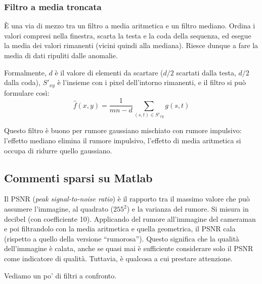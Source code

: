 \documentclass[a4paper,11pt]{article}
\begin{document}
\subsubsection{Filtro a media troncata}
È una via di mezzo tra un filtro a media aritmetica e un filtro mediano. Ordina i valori compresi nella finestra, scarta la testa e la coda della sequenza,
ed esegue la media dei valori rimanenti (vicini quindi alla mediana). Riesce dunque a fare la media di dati ripuliti dalle anomalie.
\par
Formalmente, $d$ è il valore di elementi da scartare ($d/2$ scartati dalla testa, $d/2$ dalla coda), $S'_{xy}$ è l'insieme con i pixel dell'intorno rimanenti,
e il filtro si può formulare così:
\[
\hat{f}(x,y) = \frac{1}{mn-d} \sum_{(s,t) \in S'_{xy}} g(s,t)
\]
\par
Questo filtro è buono per rumore gaussiano mischiato con rumore impulsivo: l'effetto mediano elimina il rumore impulsivo, l'effetto di media aritmetica si occupa
di ridurre quello gaussiano.

\subsection{Commenti sparsi su Matlab}
Il PSNR (\textit{peak signal-to-noise ratio}) è il rapporto tra il massimo valore che può assumere l'immagine, al quadrato ($255^2$) e la varianza del rumore. Si misura in decibel
(con coefficiente 10).
Applicando del rumore all'immagine del cameraman e poi filtrandolo con la media aritmetica e quella geometrica, il PSNR cala (rispetto a quello della versione ``rumorosa'').
Questo significa che la qualità dell'immagine è calata, anche se quasi mai è sufficiente considerare solo il PSNR come indicatore di qualità. Tuttavia, è qualcosa a cui prestare
attenzione.
\par
Vediamo un po' di filtri a confronto.

\newpage
\end{document}
